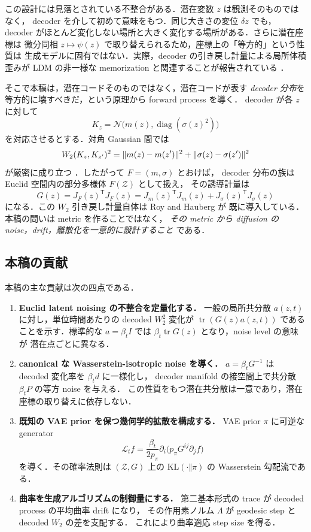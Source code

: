\documentclass[uplatex,dvipdfmx,11pt,a4paper]{jsarticle}
\begin{document}
この設計には見落とされている不整合がある．潜在変数 $z$ は観測そのものではなく，
decoder を介して初めて意味をもつ．同じ大きさの変位 $\delta z$ でも，
decoder がほとんど変化しない場所と大きく変化する場所がある．さらに潜在座標は
微分同相 $z\mapsto\psi(z)$ で取り替えられるため，座標上の「等方的」という性質は
生成モデルに固有ではない．実際，decoder の引き戻し計量による局所体積歪みが
LDM の非一様な memorization と関連することが報告されている \cite{rao2026}．

そこで本稿は，潜在コードそのものではなく，潜在コードが表す
\emph{decoder 分布}を等方的に壊すべきだ，という原理から forward process を導く．
decoder が各 $z$ に対して
\[
  K_z=\mathcal{N}\bigl(m(z),\operatorname{diag}(\sigma(z)^2)\bigr)
\]
を対応させるとする．対角 Gaussian 間では
\[
  W_2(K_z,K_{z'})^2
  =\lVert m(z)-m(z') \rVert^2+\lVert \sigma(z)-\sigma(z') \rVert^2
\]
が厳密に成り立つ \cite{givens1984}．したがって $F=(m,\sigma)$ とおけば，
decoder 分布の族は Euclid 空間内の部分多様体 $F(\mathcal{Z})$ として扱え，
その誘導計量は
\[
  G(z)=J_F(z)^{\mathsf T}J_F(z)
  =J_m(z)^{\mathsf T}J_m(z)+J_\sigma(z)^{\mathsf T}J_\sigma(z)
\]
になる．この $W_2$ 引き戻し計量自体は Roy and Hauberg \cite{roy2022} が
既に導入している．本稿の問いは metric を作ることではなく，
\emph{その metric から diffusion の noise，drift，離散化を一意的に設計すること}
である．

\subsection{本稿の貢献}

本稿の主な貢献は次の四点である．

\begin{enumerate}
  \item \textbf{Euclid latent noising の不整合を定量化する．}
    一般の局所共分散 $a(z,t)$ に対し，単位時間あたりの decoded $W_2^2$ 変化が
    $\operatorname{tr}(G(z)a(z,t))$ であることを示す．標準的な
    $a=\beta_tI$ では $\beta_t\operatorname{tr}G(z)$ となり，noise level の意味が
    潜在点ごとに異なる．
  \item \textbf{canonical な Wasserstein-isotropic noise を導く．}
    $a=\beta_tG^{-1}$ は decoded 変化率を $\beta_td$ に一様化し，
    decoder manifold の接空間上で共分散 $\beta_tP$ の等方 noise を与える．
    この性質をもつ潜在共分散は一意であり，潜在座標の取り替えに依存しない．
  \item \textbf{既知の VAE prior を保つ幾何学的拡散を構成する．}
    VAE prior $\pi$ に可逆な generator
    \[
      \mathcal{L}_t f
      =\frac{\beta_t}{2p_\pi}\partial_i
       \bigl(p_\pi G^{ij}\partial_jf\bigr)
    \]
    を導く．その確率法則は $(\mathcal{Z},G)$ 上の
    $\mathrm{KL}(\cdot\Vert\pi)$ の Wasserstein 勾配流である．
  \item \textbf{曲率を生成アルゴリズムの制御量にする．}
    第二基本形式の trace が decoded process の平均曲率 drift になり，
    その作用素ノルム $\Lambda$ が geodesic step と decoded $W_2$ の差を支配する．
    これにより曲率適応 step size を得る．
\end{enumerate}
\end{document}
